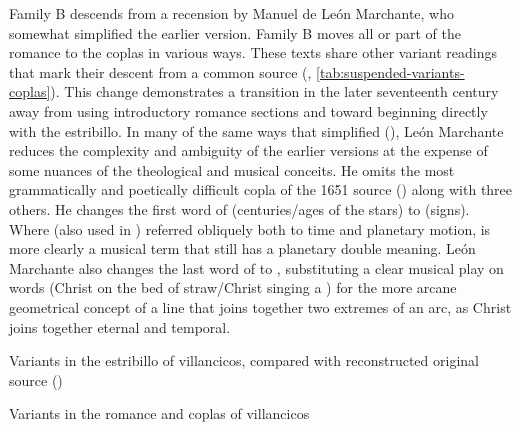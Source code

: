 Family B descends from a recension by Manuel de León Marchante, who somewhat
simplified the earlier version.%
    \Autocite[139]{LeonMarchante:Obras1733}
Family B moves all or part of the romance to the coplas in various ways.
These texts share other variant readings that mark their descent from a common
source (, 
\ref{tab:suspended-variants-coplas}).
This change demonstrates a transition in the later seventeenth century away from
using introductory romance sections and toward beginning directly with
the estribillo.%
    \Autocite{Torrente:Estribillo}
In many of the same ways that  simplified
 (), León Marchante
reduces the complexity and ambiguity of the earlier versions at the expense of
some nuances of the theological and musical conceits.
He omits the most grammatically and poetically difficult copla of the 1651
source () along with three others.
He changes the first word of  (centuries/ages of
the stars) to  (signs). 
Where  (also used in ) referred obliquely both to
time and planetary motion,  is more clearly a musical term that
still has a planetary double meaning.
León Marchante also changes the last word of 
to , substituting a clear musical play on words (Christ
 on the bed of straw/Christ singing a ) for the
more arcane geometrical concept of a line that joins together two extremes of
an arc, as Christ joins together eternal and temporal.


\begin{table}
    \caption{Variants in the estribillo of 
    villancicos, compared with reconstructed original source
    ()}
    \label{tab:suspended-variants-estribillo}
\end{table}

\begin{table}
    \caption{Variants in the romance and coplas of 
    villancicos} 
    \label{tab:suspended-variants-coplas}
\end{table}

